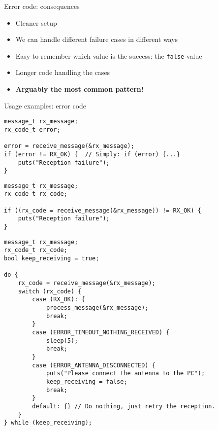 \documentclass[aspectratio=169,14pt]{beamer}
\begin{document}
\begin{frame}[fragile]{Error code: consequences}
\begin{itemize}
    \item Cleaner setup
    \item We can handle different failure cases in different ways
    \item Easy to remember which value is the success: the \texttt{false} value
    \item Longer code handling the cases
    \item \textbf{Arguably the most common pattern!}
\end{itemize}
\end{frame}


\begin{frame}[fragile]{Usage examples: error code}
\begin{lstlisting}[style=cstyle]
message_t rx_message;
rx_code_t error;

error = receive_message(&rx_message);
if (error != RX_OK) {  // Simply: if (error) {...}
    puts("Reception failure");
}
\end{lstlisting}

\begin{lstlisting}[style=cstyle]
message_t rx_message;
rx_code_t rx_code;

if ((rx_code = receive_message(&rx_message)) != RX_OK) {
    puts("Reception failure");
}
\end{lstlisting}
\end{frame}

\begin{frame}[fragile]{}
\begin{lstlisting}[style=cstyle,basicstyle=\scriptsize\ttfamily]
message_t rx_message;
rx_code_t rx_code;
bool keep_receiving = true;

do {
    rx_code = receive_message(&rx_message);
    switch (rx_code) {
        case (RX_OK): {
            process_message(&rx_message);
            break;
        }
        case (ERROR_TIMEOUT_NOTHING_RECEIVED) {
            sleep(5);
            break;
        }
        case (ERROR_ANTENNA_DISCONNECTED) {
            puts("Please connect the antenna to the PC");
            keep_receiving = false;
            break;
        }
        default: {} // Do nothing, just retry the reception.
    }
} while (keep_receiving);
\end{lstlisting}
\end{frame}
\end{document}
